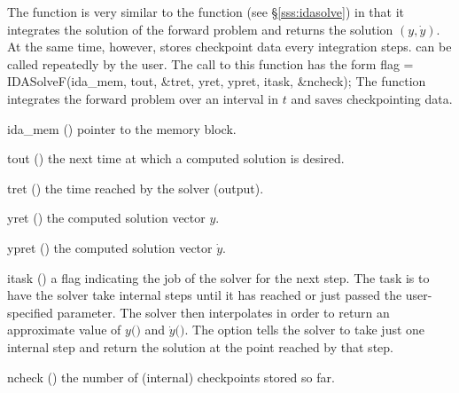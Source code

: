 The function  is very similar to the {\idas} function 
(see \S\ref{sss:idasolve}) in that it integrates the solution of the forward
problem and returns the solution $(y,\dot{y})$. At the same time, however, 
 stores checkpoint data every  integration steps.  
can be called repeatedly by the user.
The call to this function has the form
{
  flag = IDASolveF(ida\_mem, tout, \&tret, yret, ypret, itask, \&ncheck);
}
{
  The function  integrates the forward problem over an interval in $t$
  and saves checkpointing data.
}
{
  \begin{args}
  \item[ida\_mem] ()
    pointer to the {\idas} memory block.
  \item[tout] ()
    the next time at which a computed solution is desired.
  \item[tret] ()
    the time reached by the solver (output).
  \item[yret] ()
    the computed solution vector $y$.
  \item[ypret] ()
    the computed solution vector $\dot{y}$.
  \item[itask] ()
    a flag indicating the job of the solver for the next step. 
    The  task is to have the solver take internal steps until   
    it has reached or just passed the user-specified 
    parameter. The solver then interpolates in order to   
    return an approximate value of $y($$)$ and $\dot{y}($$)$. 
    The  option tells the solver to take just one internal step  
    and return the solution at the point reached by that step. 
  \item[ncheck] ()
    the number of (internal) checkpoints stored so far.
  \end{args}
}
